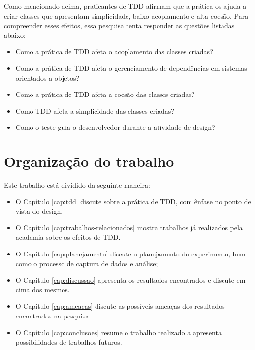 Como mencionado acima, praticantes de TDD afirmam que a prática os ajuda a criar
classes que apresentam simplicidade, baixo acoplamento e alta coesão. Para
compreender esses efeitos, essa pesquisa tenta responder as questões listadas
abaixo:

\begin{itemize}

  \item Como a prática de TDD afeta o acoplamento das classes criadas?

  \item Como a prática de TDD afeta o gerenciamento de dependências em sistemas
  orientados a objetos?

  \item Como a prática de TDD afeta a coesão das classes criadas?

  \item Como TDD afeta a simplicidade das classes criadas?

  \item Como o teste guia o desenvolvedor durante a atividade de
  design?

\end{itemize}

\section{Organização do trabalho}

Este trabalho está dividido da seguinte maneira: 

\begin{itemize}
	\item O Capítulo \ref{cap:tdd} discute sobre a prática de TDD, com ênfase no
	ponto de vista do design.
  
	\item O Capítulo \ref{cap:trabalhos-relacionados} mostra trabalhos já
	realizados pela academia sobre os efeitos de TDD.

	\item O Capítulo \ref{cap:planejamento} discute o planejamento do experimento,
	bem como o processo de captura de dados e análise;

	\item O Capítulo \ref{cap:discussao} apresenta os resultados encontrados e
	discute em cima dos mesmos.
	
	\item O Capítulo \ref{cap:ameacas} discute as possíveis ameaças dos resultados
	encontrados na pesquisa.
	
	\item O Capítulo \ref{cap:conclusoes} resume o trabalho realizado a apresenta
	possibilidades de trabalhos futuros.
\end{itemize}
